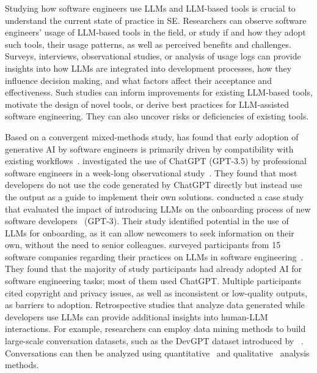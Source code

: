 \label{sec:studying-llm-usage-in-software-engineering}


Studying how software engineers use LLMs and LLM-based tools is crucial to understand the current state of practice in SE.
Researchers can observe software engineers' usage of LLM-based tools in the field, or study if and how they adopt such tools, their usage patterns, as well as perceived benefits and challenges.
Surveys, interviews, observational studies, or analysis of usage logs can provide insights into how LLMs are integrated into development processes, how they influence decision making, and what factors affect their acceptance and effectiveness. 
Such studies can inform improvements for existing LLM-based tools, motivate the design of novel tools, or derive best practices for LLM-assisted software engineering.
They can also uncover risks or deficiencies of existing tools.


Based on a convergent mixed-methods study, \citeauthor{russo2024navigating} has found that early adoption of generative AI by software engineers is primarily driven by compatibility with existing workflows~\cite{russo2024navigating}.
\citeauthor{DBLP:journals/pacmse/KhojahM0N24} investigated the use of ChatGPT (GPT-3.5) by professional software engineers in a week-long observational study~\cite{DBLP:journals/pacmse/KhojahM0N24}.
They found that most developers do not use the code generated by ChatGPT directly but instead use the output as a guide to implement their own solutions.
\citeauthor{DBLP:conf/csee/AzanzaPIG24} conducted a case study that evaluated the impact of introducing LLMs on the onboarding process of new software developers~\cite{DBLP:conf/csee/AzanzaPIG24} (GPT-3).
Their study identified potential in the use of LLMs for onboarding, as it can allow newcomers to seek information on their own, without the need to  senior colleagues.
 \citeauthor{DBLP:conf/icsa/JahicS24} surveyed participants from 15 software companies regarding their practices on LLMs in software engineering~\cite{DBLP:conf/icsa/JahicS24}.
They found that the majority of study participants had already adopted AI for software engineering tasks; most of them used ChatGPT.
Multiple participants cited copyright and privacy issues, as well as inconsistent or low-quality outputs, as barriers to adoption.
Retrospective studies that analyze data generated while developers use LLMs can provide additional insights into human-LLM interactions.
For example, researchers can employ data mining methods to build large-scale conversation datasets, such as the DevGPT dataset introduced by \citeauthor{DBLP:conf/msr/XiaoTHM24}~\cite{DBLP:conf/msr/XiaoTHM24}.
Conversations can then be analyzed using quantitative~\cite{DBLP:conf/msr/RabbiCZI24} and qualitative~\cite{DBLP:conf/msr/MohamedPP24} analysis methods.

